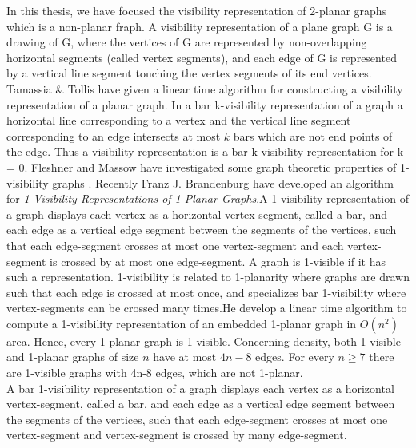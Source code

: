 In this thesis, we have focused the visibility representation of 2-planar graphs which is a non-planar fraph. A visibility representation of a plane graph G is a drawing of G, where the vertices of G are represented by non-overlapping horizontal segments (called vertex segments), and each edge of G is represented by a vertical line segment touching the vertex segments of its end vertices. Tamassia \& Tollis \cite{R} have given a linear time algorithm for constructing a visibility representation of a planar graph. In a bar k-visibility representation of a graph a horizontal line corresponding to a vertex and the vertical line segment corresponding to an edge intersects at most $k$ bars which are not end points of the edge. Thus a visibility representation is a bar k-visibility representation for k = 0. Fleshner and Massow have investigated some graph theoretic properties of  1-visibility graphs \cite{S}. 
Recently Franz J. Brandenburg \cite{FJ} have developed an algorithm for \emph{1-Visibility Representations of 1-Planar Graphs}.A 1-visibility representation of a graph displays each vertex as a horizontal vertex-segment, called a bar, and each edge as a vertical edge segment between the segments of the vertices, such that each edge-segment crosses at most one vertex-segment and each vertex-segment is crossed by at most one edge-segment. A graph is 1-visible if it has such a representation. 1-visibility is related to 1-planarity where graphs are drawn such that each edge is crossed at most once, and specializes bar 1-visibility where vertex-segments can be crossed many times.He develop a linear time algorithm to compute a 1-visibility representation of an embedded 1-planar graph in $O(n^{2})$ area. Hence, every 1-planar graph is 1-visible. Concerning density, both 1-visible and 1-planar graphs of size $n$ have at most $4n-8$ edges. For every $n \geq 7$ there are 1-visible graphs with 4n-8 edges, which are not 1-planar.
\\
A bar 1-visibility representation of a graph displays each vertex as a horizontal vertex-segment, called a bar, and each edge as a vertical edge segment between the segments of the vertices, such that each edge-segment crosses at most one vertex-segment and  vertex-segment is crossed by many edge-segment.


